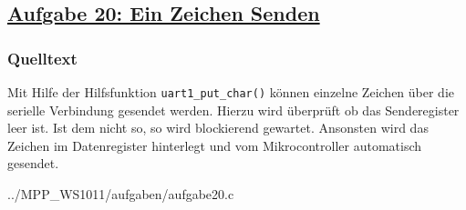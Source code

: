 \subsection*
{\href{http://cst.mi.fu-berlin.de/intern/19606-P-MPP/Aufgaben/040701.html}
{Aufgabe 20: Ein Zeichen Senden}}

\subsubsection*{Quelltext}
Mit Hilfe der Hilfsfunktion \texttt{uart1\_put\_char()} können einzelne Zeichen über die serielle Verbindung gesendet werden. Hierzu wird überprüft ob das Senderegister leer ist. Ist dem nicht so, so wird blockierend gewartet. Ansonsten wird das Zeichen im Datenregister hinterlegt und vom Mikrocontroller automatisch gesendet.

{../MPP_WS1011/aufgaben/aufgabe20.c}
